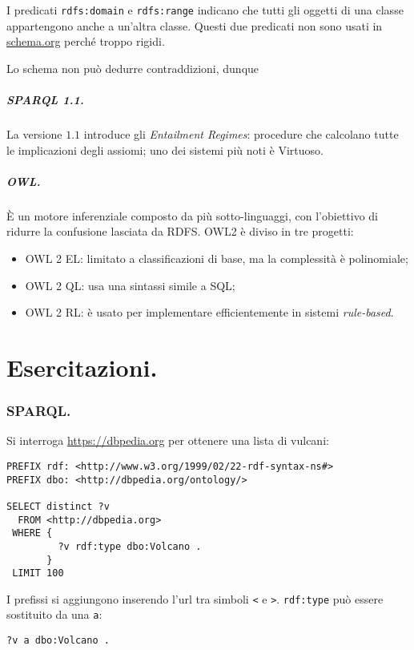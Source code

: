 \documentclass[11pt]{article}
\begin{document}
\begin{multicols}{2}
I predicati \verb|rdfs:domain| e \verb|rdfs:range| indicano che tutti gli oggetti di una classe appartengono anche a un'altra classe.
Questi due predicati non sono usati in \url{schema.org} perché troppo rigidi.

Lo schema non può dedurre contraddizioni, dunque

\subsubsection{SPARQL 1.1.}
La versione $1.1$ introduce gli \textit{Entailment Regimes}: procedure che calcolano tutte le implicazioni degli assiomi; uno dei sistemi più noti è Virtuoso.

\subsubsection{OWL.}
È un motore inferenziale composto da più sotto-linguaggi, con l'obiettivo di ridurre la confusione lasciata da RDFS.
OWL2 è diviso in tre progetti:
\begin{itemize}
  \item OWL 2 EL: limitato a classificazioni di base, ma la complessità è polinomiale;
  \item OWL 2 QL: usa una sintassi simile a SQL;
  \item OWL 2 RL: è usato per implementare efficientemente in sistemi \textit{rule-based}.
\end{itemize}


\newpage
\end{multicols}
\part{Esercitazioni.}

\section{SPARQL.}
Si interroga \url{https://dbpedia.org} per ottenere una lista di vulcani:
\begin{verbatim}
PREFIX rdf: <http://www.w3.org/1999/02/22-rdf-syntax-ns#>
PREFIX dbo: <http://dbpedia.org/ontology/>

SELECT distinct ?v
  FROM <http://dbpedia.org>
 WHERE {
         ?v rdf:type dbo:Volcano .
       }
 LIMIT 100
\end{verbatim}
I prefissi si aggiungono inserendo l'url tra simboli \verb|<| e \verb|>|.
\verb|rdf:type| può essere sostituito da una \verb|a|:
\begin{verbatim}
?v a dbo:Volcano .
\end{verbatim}
\end{document}

